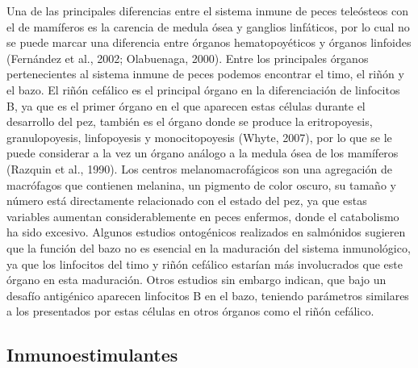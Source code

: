 \documentclass[12pt,a4paper,]{article}
\begin{document}
Una de las principales diferencias entre el sistema inmune de peces
teleósteos con el de mamíferos es la carencia de medula ósea y ganglios
linfáticos, por lo cual no se puede marcar una diferencia entre órganos
hematopoyéticos y órganos linfoides (Fernández et al., 2002; Olabuenaga,
2000)⁠. Entre los principales órganos pertenecientes al sistema inmune
de peces podemos encontrar el timo, el riñón y el bazo. El riñón
cefálico es el principal órgano en la diferenciación de linfocitos B, ya
que es el primer órgano en el que aparecen estas células durante el
desarrollo del pez, también es el órgano donde se produce la
eritropoyesis, granulopoyesis, linfopoyesis y monocitopoyesis (Whyte,
2007), por lo que se le puede considerar a la vez un órgano análogo a la
medula ósea de los mamíferos (Razquin et al., 1990)⁠. Los centros
melanomacrofágicos son una agregación de macrófagos que contienen
melanina, un pigmento de color oscuro, su tamaño y número está
directamente relacionado con el estado del pez, ya que estas variables
aumentan considerablemente en peces enfermos, donde el catabolismo ha
sido excesivo. Algunos estudios ontogénicos realizados en salmónidos
sugieren que la función del bazo no es esencial en la maduración del
sistema inmunológico, ya que los linfocitos del timo y riñón cefálico
estarían más involucrados que este órgano en esta maduración. Otros
estudios sin embargo indican, que bajo un desafío antigénico aparecen
linfocitos B en el bazo, teniendo parámetros similares a los presentados
por estas células en otros órganos como el riñón cefálico.

\clearpage

\subsection{Inmunoestimulantes}\label{inmunoestimulantes}
\end{document}
